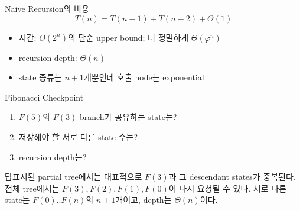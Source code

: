 \begin{frame}{Naive Recursion의 비용}
\[
T(n)=T(n-1)+T(n-2)+\Theta(1)
\]
\begin{itemize}\item 시간: $O(2^n)$의 단순 upper bound; 더 정밀하게 $\Theta(\varphi^n)$\item recursion depth: $\Theta(n)$\item state 종류는 $n+1$개뿐인데 호출 node는 exponential\end{itemize}
\end{frame}
\begin{frame}{Fibonacci Checkpoint}
\begin{enumerate}\item $F(5)$와 $F(3)$ branch가 공유하는 state는?\item 저장해야 할 서로 다른 state 수는?\item recursion depth는?\end{enumerate}
\begin{exampleblock}{답}표시된 partial tree에서는 대표적으로 $F(3)$과 그 descendant states가 중복된다. 전체 tree에서는 $F(3),F(2),F(1),F(0)$이 다시 요청될 수 있다. 서로 다른 state는 $F(0)..F(n)$의 $n+1$개이고, depth는 $\Theta(n)$이다.\end{exampleblock}
\vfill{}
\end{frame}
